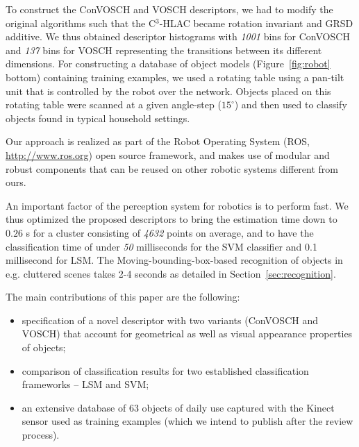 \documentclass[letterpaper, 10 pt, conference]{sty/ieeeconf}
\begin{document}
To construct the ConVOSCH and VOSCH descriptors, we had to modify the original algorithms
such that the C$^3$-HLAC became rotation invariant and GRSD 
additive. We thus obtained descriptor histograms with 
\emph{1001} bins for ConVOSCH and \emph{137} bins for VOSCH representing the transitions between its different dimensions.
For constructing a database of object models (Figure~\ref{fig:robot} bottom)
containing training examples, we used a rotating
table using a pan-tilt unit that is controlled by the robot over the
network. Objects placed on this rotating table were scanned at a given
angle-step ($15^\circ$) and then used to classify objects found in
typical household settings.

Our approach is realized as part of the Robot Operating System
(ROS, \url{http://www.ros.org}) open source framework, and makes
use of modular and robust components that can be reused on other robotic
systems different from ours.

An important factor of the perception system for robotics is to perform fast. We thus optimized
the proposed descriptors to bring the estimation time down to $0.26$ s for a cluster consisting of 
\emph{4632} points on average, and to have the classification time of under \emph{50} milliseconds
for the SVM classifier and 0.1 millisecond for LSM. The Moving-bounding-box-based
recognition of objects in e.g. cluttered scenes takes 2-4 seconds as detailed
in Section~\ref{sec:recognition}.

The main contributions of this paper are the following:
\begin{itemize}
\item specification of a novel descriptor with two variants (ConVOSCH and VOSCH) that account for
geometrical as well as visual appearance  properties of objects;
\item comparison of classification results for two established classification
frameworks -- LSM and SVM;
\item an extensive database of 63 objects of daily use captured with the Kinect sensor
used as training examples (which we intend to publish after the review process).
\end{itemize}
\end{document}
